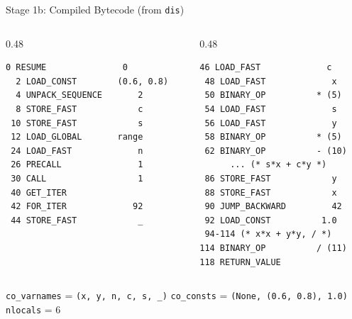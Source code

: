 \documentclass[aspectratio=169]{beamer}
\begin{document}
\begin{frame}[fragile]{Stage 1b: Compiled Bytecode (from \texttt{dis})}
\begin{columns}[T]
\begin{column}{0.48\textwidth}
\begin{lstlisting}[basicstyle=\ttfamily\tiny, title={Bytecode (selected)}]
  0 RESUME               0
  2 LOAD_CONST        (0.6, 0.8)
  4 UNPACK_SEQUENCE       2
  8 STORE_FAST            c
 10 STORE_FAST            s
 12 LOAD_GLOBAL       range
 24 LOAD_FAST             n
 26 PRECALL               1
 30 CALL                  1
 40 GET_ITER
 42 FOR_ITER             92
 44 STORE_FAST            _
\end{lstlisting}
\end{column}
\begin{column}{0.48\textwidth}
\begin{lstlisting}[basicstyle=\ttfamily\tiny, title={Bytecode (cont.)}]
 46 LOAD_FAST             c
 48 LOAD_FAST             x
 50 BINARY_OP          * (5)
 54 LOAD_FAST             s
 56 LOAD_FAST             y
 58 BINARY_OP          * (5)
 62 BINARY_OP          - (10)
      ... (* s*x + c*y *)
 86 STORE_FAST            y
 88 STORE_FAST            x
 90 JUMP_BACKWARD         42
 92 LOAD_CONST          1.0
 94-114 (* x*x + y*y, / *)
114 BINARY_OP          / (11)
118 RETURN_VALUE
\end{lstlisting}
\end{column}
\end{columns}
\vspace{0.4em}
\begin{center}
\footnotesize
\texttt{co\_varnames} = \texttt{(x, y, n, c, s, \_)} \quad
\texttt{co\_consts} = \texttt{(None, (0.6, 0.8), 1.0)} \quad
\texttt{nlocals} = 6
\end{center}
\end{frame}


\end{document}

